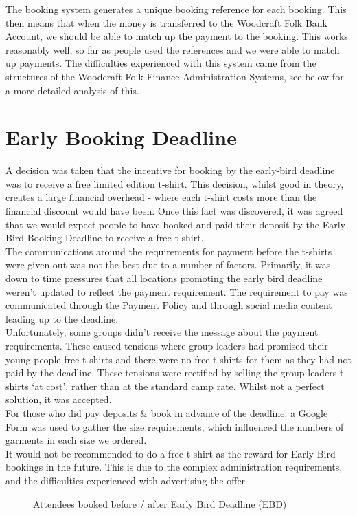 The booking system generates a unique booking reference for each booking. This then means that when the money is transferred to the Woodcraft Folk Bank Account, we should be able to match up the payment to the booking. This works reasonably well, so far as people used the references and we were able to match up payments. The difficulties experienced with this system came from the structures of the Woodcraft Folk Finance Administration Systems, see below for a more detailed analysis of this. 

\section{Early Booking Deadline}
A decision was taken that the incentive for booking by the early-bird deadline was to receive a free limited edition t-shirt. This decision, whilst good in theory, creates a large financial overhead - where each t-shirt costs more than the financial discount would have been. Once this fact was discovered, it was agreed that we would expect people to have booked and paid their deposit by the Early Bird Booking Deadline to receive a free t-shirt.\\

The communications around the requirements for payment before the t-shirts were given out was not the best due to a number of factors. Primarily, it was down to time pressures that all locations promoting the early bird deadline weren't updated to reflect the payment requirement. The requirement to pay was communicated through the Payment Policy and through social media content leading up to the deadline.\\

Unfortunately, some groups didn't receive the message about the payment requirements. These caused tensions where group leaders had promised their young people free t-shirts and there were no free t-shirts for them as they had not paid by the deadline. These tensions were rectified by selling the group leaders t-shirts `at cost', rather than at the standard camp rate. Whilst not a perfect solution, it was accepted. \\

For those who did pay deposits \& book in advance of the deadline: a Google Form was used to gather the size requirements, which influenced the numbers of garments in each size we ordered. \\

It would not be recommended to do a free t-shirt as the reward for Early Bird bookings in the future. This is due to the complex administration requirements, and the difficulties experienced with advertising the offer

\begin{figure}[ht]
    \centering
    \caption{Attendees booked before / after Early Bird Deadline (EBD)}
    
\end{figure}